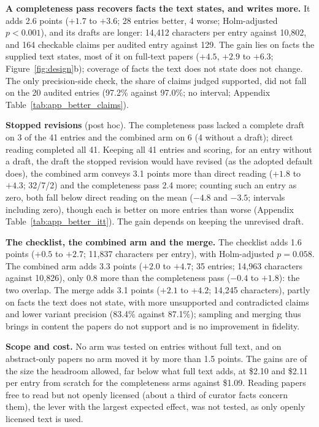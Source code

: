 \documentclass{article} %
\begin{document}
\textbf{A completeness pass recovers facts the text states, and writes more.} It adds 2.6 points ($+1.7$ to $+3.6$; 28 entries better, 4 worse; Holm-adjusted $p<0.001$), and its drafts are longer: 14,412 characters per entry against 10,802, and 164 checkable claims per audited entry against 129. The gain lies on facts the supplied text states, most of it on full-text papers ($+4.5$, $+2.9$ to $+6.3$; Figure~\ref{fig:design}b); coverage of facts the text does not state does not change. The only precision-side check, the share of claims judged supported, did not fall on the 20 audited entries (97.2\% against 97.0\%; no interval; Appendix Table~\ref{tab:app_better_claims}).

\textbf{Stopped revisions} (post hoc). The completeness pass lacked a complete draft on 3 of the 41 entries and the combined arm on 6 (4 without a draft); direct reading completed all 41. Keeping all 41 entries and scoring, for an entry without a draft, the draft the stopped revision would have revised (as the adopted default does), the combined arm conveys 3.1 points more than direct reading ($+1.8$ to $+4.3$; 32/7/2) and the completeness pass 2.4 more; counting such an entry as zero, both fall below direct reading on the mean ($-4.8$ and $-3.5$; intervals including zero), though each is better on more entries than worse (Appendix Table~\ref{tab:app_better_itt}). The gain depends on keeping the unrevised draft.

\textbf{The checklist, the combined arm and the merge.} The checklist adds 1.6 points ($+0.5$ to $+2.7$; 11,837 characters per entry), with Holm-adjusted $p=0.058$. The combined arm adds 3.3 points ($+2.0$ to $+4.7$; 35 entries; 14,963 characters against 10,826), only 0.8 more than the completeness pass ($-0.4$ to $+1.8$): the two overlap. The merge adds 3.1 points ($+2.1$ to $+4.2$; 14,245 characters), partly on facts the text does not state, with more unsupported and contradicted claims and lower variant precision (83.4\% against 87.1\%); sampling and merging thus brings in content the papers do not support and is no improvement in fidelity.

\textbf{Scope and cost.} No arm was tested on entries without full text, and on abstract-only papers no arm moved it by more than 1.5 points. The gains are of the size the headroom allowed, far below what full text adds, at \$2.10 and \$2.11 per entry from scratch for the completeness arms against \$1.09. Reading papers free to read but not openly licensed (about a third of curator facts concern them), the lever with the largest expected effect, was not tested, as only openly licensed text is used.
\end{document}
